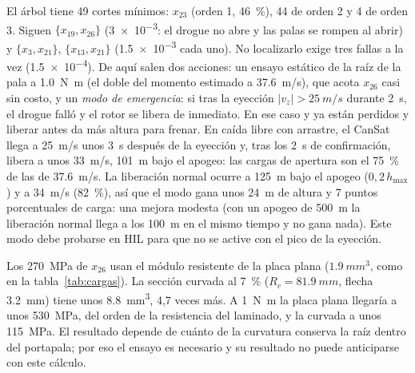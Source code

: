 El árbol tiene 49 cortes mínimos: $x_{23}$ (orden 1, \SI{46}{\percent}), 44 de orden 2 y
4 de orden 3. Siguen $\{x_{19},x_{26}\}$ (\num{3e-3}: el drogue no abre y las palas se
rompen al abrir) y $\{x_3,x_{21}\}$, $\{x_{13},x_{21}\}$ (\num{1.5e-3} cada uno). No
localizarlo exige tres fallas a la vez (\num{1.5e-4}). De aquí salen dos acciones: un
ensayo estático de la raíz de la pala a \SI{1.0}{N.m} (el doble del momento estimado a
\SI{37.6}{m/s}), que acota $x_{26}$ casi sin costo, y un \emph{modo de emergencia}: si tras
la eyección $|v_z|>\SI{25}{m/s}$ durante \SI{2}{s}, el drogue falló y el rotor se libera
de inmediato. En ese caso  y  ya están perdidos y liberar antes da más
altura para frenar. En caída libre con arrastre, el CanSat llega a \SI{25}{m/s} unos
\SI{3}{s} después de la eyección y, tras los \SI{2}{s} de confirmación, libera a unos
\SI{33}{m/s}, \SI{101}{m} bajo el apogeo: las cargas de apertura son el \SI{75}{\percent} de las de
\SI{37.6}{m/s}. La liberación normal ocurre a \SI{125}{m} bajo el apogeo ($0{,}2\,h_{\max}$) y
a \SI{34}{m/s} (\SI{82}{\percent}), así que el modo gana unos \SI{24}{m} de altura y
7 puntos porcentuales de carga: una mejora modesta (con un apogeo de \SI{500}{m} la liberación
normal llega a los \SI{100}{m} en el mismo tiempo y no gana nada). Este modo debe probarse en HIL para que no se active
con el pico de la eyección.

\begin{nota}
Los \SI{270}{MPa} de $x_{26}$ usan el módulo resistente de la placa plana
($\SI{1.9}{mm^3}$, como en la tabla~\ref{tab:cargas}). La sección curvada al
\SI{7}{\percent} ($R_c=\SI{81.9}{mm}$, flecha \SI{3.2}{mm}) tiene unos \SI{8.8}{mm^3},
4,7 veces más. A \SI{1}{N.m} la placa plana llegaría a unos \SI{530}{MPa}, del orden de
la resistencia del laminado, y la curvada a unos \SI{115}{MPa}. El resultado depende de
cuánto de la curvatura conserva la raíz dentro del portapala; por eso el ensayo es
necesario y su resultado no puede anticiparse con este cálculo.
\end{nota}

